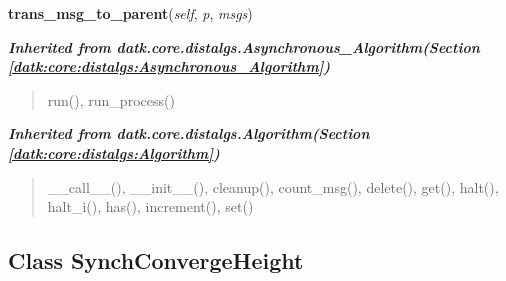    \vspace{0.5ex}

\hspace{.8\funcindent}\begin{boxedminipage}{\funcwidth}

    \raggedright \textbf{trans\_msg\_to\_parent}(\textit{self}, \textit{p}, \textit{msgs})

\setlength{\parskip}{2ex}
\setlength{\parskip}{1ex}
    \end{boxedminipage}


\large{\textbf{\textit{Inherited from datk.core.distalgs.Asynchronous\_Algorithm\textit{(Section \ref{datk:core:distalgs:Asynchronous_Algorithm})}}}}

\begin{quote}
run(), run\_process()
\end{quote}

\large{\textbf{\textit{Inherited from datk.core.distalgs.Algorithm\textit{(Section \ref{datk:core:distalgs:Algorithm})}}}}

\begin{quote}
\_\_call\_\_(), \_\_init\_\_(), cleanup(), count\_msg(), delete(), get(), halt(), halt\_i(), has(), increment(), set()
\end{quote}


\subsection{Class SynchConvergeHeight}

